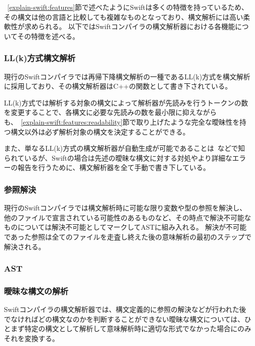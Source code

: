 ~\ref{explain-swift:features}節で述べたようにSwiftは多くの特徴を持っているため、その構文は他の言語と比較しても複雑なものとなっており、構文解析には高い柔軟性が求められる。
以下ではSwiftコンパイラの構文解析器における各機能についてその特徴を述べる。


\subsubsection{LL(k)方式構文解析}

現行のSwiftコンパイラでは再帰下降構文解析の一種であるLL(k)方式を構文解析に採用しており、その構文解析器はC++の関数として書き下されている。

LL(k)方式では解析する対象の構文によって解析器が先読みを行うトークンの数を変更することで、各構文に必要な先読みの数を最小限に抑えながらも、~\ref{explain-swift:features:readability}節で取り上げたような完全な曖昧性を持つ構文以外は必ず解析対象の構文を決定することができる。

また、単なるLL(k)方式の構文解析器が自動生成が可能であることは~\cite{antlr}などで知られているが、Swiftの場合は先述の曖昧な構文に対する対処やより詳細なエラーの報告を行うために、構文解析器を全て手動で書き下している。

\subsubsection{参照解決}

現行のSwiftコンパイラでは構文解析時に可能な限り変数や型の参照を解決し、他のファイルで宣言されている可能性のあるものなど、その時点で解決不可能なものについては解決不可能としてマークしてASTに組み入れる。
解決が不可能であった参照は全てのファイルを走査し終えた後の意味解析の最初のステップで解決される。


\subsubsection{AST}


\subsubsection{曖昧な構文の解析}

Swiftコンパイラの構文解析器では、構文定義的に参照の解決などが行われた後でなければどの構文なのかを判断することができない曖昧な構文については、ひとまず特定の構文として解析して意味解析時に適切な形式でなかった場合にのみそれを変換する。

